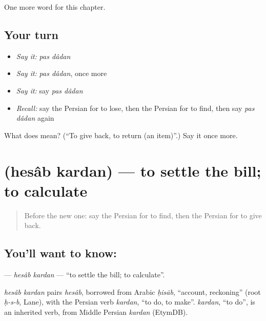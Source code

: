\begin{grammarlens}[title={What you've built}]
One more word for this chapter.
\end{grammarlens}

\subsection*{Your turn}
\begin{itemize}
\raggedright
  \item \emph{Say it:} \emph{pas dâdan}
  \item \emph{Say it:} \emph{pas dâdan}, once more
  \item \emph{Say it:} say \emph{pas dâdan}
  \item \emph{Recall:} say the Persian for to lose, then the Persian for to find, then say \emph{pas dâdan} again
\end{itemize}

\begin{tcolorbox}[breakable,colback=teal!4,colframe=teal!35!black,title={Before you move on}]
What does   mean? (\textquotedblleft{}To give back, to return (an item)\textquotedblright{}.) Say it once more.
\end{tcolorbox}
\section[\texorpdfstring{\fa{حساب} \fa{کردن} (hesâb kardan)}{حساب کردن (hesâb kardan)}]{  (hesâb kardan) — to settle the bill; to calculate}

\label{lesson:FA-C141-hesab-kardan}



\begin{quote}
Before the new one: say the Persian for to find, then the Persian for to give back.
\end{quote}

\subsection*{You'll want to know:  }
\textbf{ } — \emph{hesâb kardan} — \textquotedblleft{}to settle the bill; to calculate\textquotedblright{}.

\begin{cousinweb}
\emph{hesâb kardan} pairs \emph{hesâb}, borrowed from Arabic \emph{ḥisāb}, \textquotedblleft{}account, reckoning\textquotedblright{} (root \emph{ḥ-s-b}, Lane), with the Persian verb \emph{kardan}, \textquotedblleft{}to do, to make\textquotedblright{}. \emph{kardan}, \textquotedblleft{}to do\textquotedblright{}, is an inherited verb, from Middle Persian \emph{kardan} (EtymDB).
\end{cousinweb}

